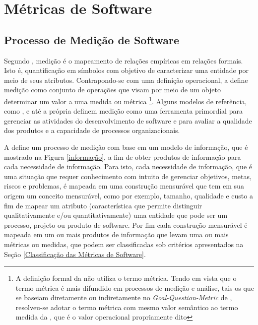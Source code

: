 \chapter{Métricas de Software}

\section{Processo de Medição de Software}

Segundo , medição é o mapeamento de relações empíricas em relações formais. Isto é, quantificação em símbolos com objetivo de caracterizar uma entidade por meio de seus atributos. Contrapondo-se com uma  definição operacional, a  define medição como conjunto de operações que visam por meio de um objeto determinar um valor a uma medida ou métrica \footnote{A definição formal da  não utiliza o termo métrica. Tendo em vista que o termo métrica é mais difundido em processos de medição e análise, tais os que se baseiam diretamente ou indiretamente no \textit{Goal-Question-Metric} de , resolveu-se adotar o termo métrica com mesmo valor semântico ao termo medida da , que é o valor operacional propriamente dito}. Alguns modelos de referência, como , e até a própria  definem medição como uma ferramenta primordial para gerenciar as atividades do desenvolvimento de software e para avaliar a qualidade dos produtos e a capacidade de processos organizacionais. 


A  define um processo de medição com base em um modelo de
informação, que é mostrado na Figura \ref{informação}, a fim de obter produtos de informação para cada necessidade de informação. Para isto, cada necessidade de informação, que é uma situação que requer conhecimento com intuito de  gerenciar objetivos, metas, riscos e problemas, é mapeada em uma construção  mensurável que tem em sua origem um conceito mensurável, como por exemplo,  tamanho, qualidade e custo a fim de mapear um atributo (característica  que permite distinguir qualitativamente e/ou quantitativamente) uma entidade que pode ser um processo, projeto ou produto de software. Por fim  cada construção mensurável é mapeada em um ou mais produtos de informação que  levam uma ou mais métricas ou medidas, que podem ser classificadas sob  critérios apresentados na Seção \ref{Classificação das Métricas de Software}.

